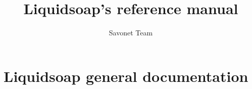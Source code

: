 \documentclass{book}
\title{Liquidsoap's reference manual}
\author{Savonet Team}
\begin{document}
\maketitle
\tableofcontents

\chapter{Liquidsoap general documentation}






























\end{document}
